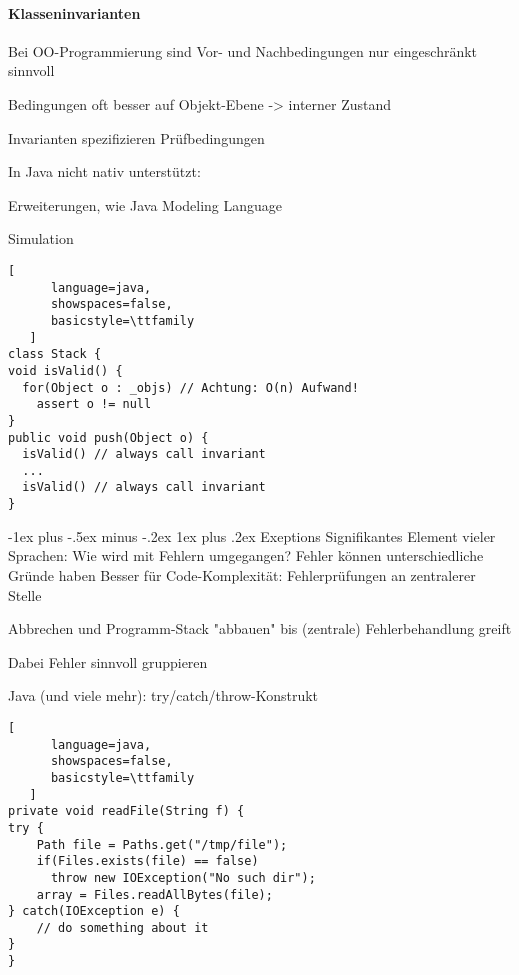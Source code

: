 \documentclass[10pt]{article}
\makeatletter
\renewcommand{\subsubsection}{\@startsection{subsubsection}{3}{0mm}%
                                {-1ex plus -.5ex minus -.2ex}%
                                {1ex plus .2ex}%
                                {\normalfont\small\bfseries}}
\makeatother
\begin{document}
\paragraph{Klasseninvarianten}
\begin{itemize*}
  \item Bei OO-Programmierung sind Vor- und Nachbedingungen nur eingeschränkt sinnvoll
  \item Bedingungen oft besser auf Objekt-Ebene -> interner Zustand
  \item Invarianten spezifizieren Prüfbedingungen
  \item In Java nicht nativ unterstützt:
  \begin{itemize*}
    \item Erweiterungen, wie Java Modeling Language
    \item Simulation
  \end{itemize*}
\end{itemize*}

\begin{lstlisting}[
      language=java,
      showspaces=false,
      basicstyle=\ttfamily
   ]
class Stack {
void isValid() {
  for(Object o : _objs) // Achtung: O(n) Aufwand!
    assert o != null
}
public void push(Object o) {
  isValid() // always call invariant
  ...
  isValid() // always call invariant
}
\end{lstlisting}


\subsubsection{Exeptions}
Signifikantes Element vieler Sprachen: Wie wird mit Fehlern umgegangen?
Fehler können unterschiedliche Gründe haben
Besser für Code-Komplexität: Fehlerprüfungen an zentralerer Stelle
\begin{itemize*}
  \item Abbrechen und Programm-Stack "abbauen" bis (zentrale) Fehlerbehandlung greift
  \item Dabei Fehler sinnvoll gruppieren
  \item Java (und viele mehr): try/catch/throw-Konstrukt
\end{itemize*}
\begin{lstlisting}[
      language=java,
      showspaces=false,
      basicstyle=\ttfamily
   ]
private void readFile(String f) {
try {
    Path file = Paths.get("/tmp/file");
    if(Files.exists(file) == false)
      throw new IOException("No such dir");
    array = Files.readAllBytes(file);
} catch(IOException e) {
    // do something about it
}
}
\end{lstlisting}
\end{document}

